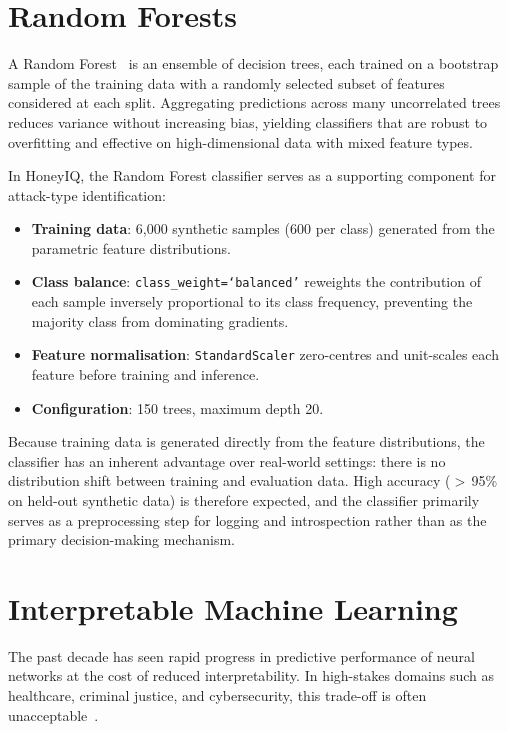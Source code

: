\section{Random Forests}
\label{sec:bg_rf}

A Random Forest~\citep{breiman2001random} is an ensemble of decision trees,
each trained on a bootstrap sample of the training data with a randomly
selected subset of features considered at each split.
Aggregating predictions across many uncorrelated trees reduces variance
without increasing bias, yielding classifiers that are robust to overfitting
and effective on high-dimensional data with mixed feature types.

In HoneyIQ, the Random Forest classifier serves as a supporting component
for attack-type identification:
%
\begin{itemize}
  \item \textbf{Training data}: 6,000 synthetic samples (600 per class)
        generated from the parametric feature distributions.
  \item \textbf{Class balance}: \texttt{class\_weight=`balanced'} reweights
        the contribution of each sample inversely proportional to its class
        frequency, preventing the majority class from dominating gradients.
  \item \textbf{Feature normalisation}: \texttt{StandardScaler} zero-centres
        and unit-scales each feature before training and inference.
  \item \textbf{Configuration}: 150 trees, maximum depth 20.
\end{itemize}

Because training data is generated directly from the feature distributions,
the classifier has an inherent advantage over real-world settings: there is
no distribution shift between training and evaluation data.
High accuracy ($>$\,95\% on held-out synthetic data) is therefore expected,
and the classifier primarily serves as a preprocessing step for logging and
introspection rather than as the primary decision-making mechanism.

\section{Interpretable Machine Learning}
\label{sec:bg_interpretable}

The past decade has seen rapid progress in predictive performance of neural
networks at the cost of reduced interpretability.
In high-stakes domains such as healthcare, criminal justice, and
cybersecurity, this trade-off is often unacceptable~\citep{rudin2019stop}.

